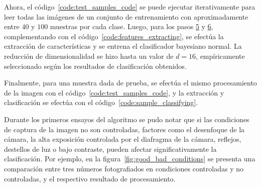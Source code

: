 Ahora, el código~\ref{code:test_samples_code} se puede ejecutar iterativamente para leer todas las imágenes de un conjunto de entrenamiento con aproximadamente entre $40$ y $100$ muestras por cada clase.
Luego, para los pasos \hyperref[sec:kpca_reduction]{5} y \hyperref[sec:nb_classifier]{6}, complementando con el código~\ref{code:features_extracting}, se efectúa la extracción de características y se entrena el clasificador bayesiano normal.
La reducción de dimensionalidad se hizo hasta un valor de $d = 16$, empíricamente seleccionado según los resultados de clasificación obtenidos.

Finalmente, para una muestra dada de prueba, se efectúa el mismo procesamiento de la imagen con el código~\ref{code:test_samples_code}, y la extracción y clasificación se efectúa con el código~\ref{code:sample_classifying}.

Durante los primeros ensayos del algoritmo se pudo notar que si las condiciones de captura de la imagen no son controladas, factores como el desenfoque de la cámara, la alta exposición controlada por el diafragma de la cámara, reflejos, destellos de luz o bajo contraste, pueden afectar significativamente la clasificación.
Por ejemplo, en la figura~\ref{fig:good_bad_conditions} se presenta una comparación entre tres números fotografiados en condiciones controladas y no controladas, y el respectivo resultado de procesamiento.

